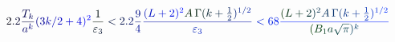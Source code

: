 \documentclass[12pt]{article}
\begin{document}
\makeatletter
\renewcommand*{\@textcolor}[3]{%
  \protect\leavevmode
  \begingroup
    \color#1{#2}#3%
  \endgroup
}
\makeatother
\begin{displaymath}
\mathcolor[RGB]{0,0,15}{2} \mathcolor[RGB]{0,0,30}{.} \mathcolor[RGB]{0,0,45}{2} \mathcolor[RGB]{0,0,60}{\frac { \mathcolor[RGB]{0,0,75}{T} _ { \mathcolor[RGB]{0,0,90}{k} } } { \mathcolor[RGB]{0,0,105}{a} ^ { \mathcolor[RGB]{0,0,120}{k} } } } \mathcolor[RGB]{0,0,135}{(} \mathcolor[RGB]{0,0,150}{3} \mathcolor[RGB]{0,0,165}{k} \mathcolor[RGB]{0,0,180}{/} \mathcolor[RGB]{0,0,195}{2} \mathcolor[RGB]{0,0,210}{+} \mathcolor[RGB]{0,0,225}{4} \mathcolor[RGB]{0,0,240}{)} ^ { \mathcolor[RGB]{0,0,255}{2} } \mathcolor[RGB]{0,15,0}{\frac { \mathcolor[RGB]{0,15,15}{1} } { \mathcolor[RGB]{0,15,30}{\varepsilon} _ { \mathcolor[RGB]{0,15,45}{3} } } } \mathcolor[RGB]{0,15,60}{<} \mathcolor[RGB]{0,15,75}{2} \mathcolor[RGB]{0,15,90}{.} \mathcolor[RGB]{0,15,105}{2} \mathcolor[RGB]{0,15,120}{\frac { \mathcolor[RGB]{0,15,135}{9} } { \mathcolor[RGB]{0,15,150}{4} } } \mathcolor[RGB]{0,15,165}{\frac { \mathcolor[RGB]{0,15,180}{(} \mathcolor[RGB]{0,15,195}{L} \mathcolor[RGB]{0,15,210}{+} \mathcolor[RGB]{0,15,225}{2} \mathcolor[RGB]{0,15,240}{)} ^ { \mathcolor[RGB]{0,15,255}{2} } \mathcolor[RGB]{0,30,0}{A} \, \mathcolor[RGB]{0,30,15}{\Gamma} \mathcolor[RGB]{0,30,30}{(} \mathcolor[RGB]{0,30,45}{k} \mathcolor[RGB]{0,30,60}{+} \mathcolor[RGB]{0,30,75}{\frac { \mathcolor[RGB]{0,30,90}{1} } { \mathcolor[RGB]{0,30,105}{2} } } \mathcolor[RGB]{0,30,120}{)} ^ { \mathcolor[RGB]{0,30,135}{1} \mathcolor[RGB]{0,30,150}{/} \mathcolor[RGB]{0,30,165}{2} } } { \mathcolor[RGB]{0,30,180}{\varepsilon} _ { \mathcolor[RGB]{0,30,195}{3} } } } \mathcolor[RGB]{0,30,210}{<} \mathcolor[RGB]{0,30,225}{6} \mathcolor[RGB]{0,30,240}{8} \mathcolor[RGB]{0,30,255}{\frac { \mathcolor[RGB]{0,45,0}{(} \mathcolor[RGB]{0,45,15}{L} \mathcolor[RGB]{0,45,30}{+} \mathcolor[RGB]{0,45,45}{2} \mathcolor[RGB]{0,45,60}{)} ^ { \mathcolor[RGB]{0,45,75}{2} } \mathcolor[RGB]{0,45,90}{A} \, \mathcolor[RGB]{0,45,105}{\Gamma} \mathcolor[RGB]{0,45,120}{(} \mathcolor[RGB]{0,45,135}{k} \mathcolor[RGB]{0,45,150}{+} \mathcolor[RGB]{0,45,165}{\frac { \mathcolor[RGB]{0,45,180}{1} } { \mathcolor[RGB]{0,45,195}{2} } } \mathcolor[RGB]{0,45,210}{)} ^ { \mathcolor[RGB]{0,45,225}{1} \mathcolor[RGB]{0,45,240}{/} \mathcolor[RGB]{0,45,255}{2} } } { \mathcolor[RGB]{0,60,0}{(} \mathcolor[RGB]{0,60,15}{B} _ { \mathcolor[RGB]{0,60,30}{1} } \mathcolor[RGB]{0,60,45}{a} \mathcolor[RGB]{0,60,60}{\sqrt { \mathcolor[RGB]{0,60,75}{\pi} } } \mathcolor[RGB]{0,60,90}{)} ^ { \mathcolor[RGB]{0,60,105}{k} } } }
\end{displaymath}
\end{document}
